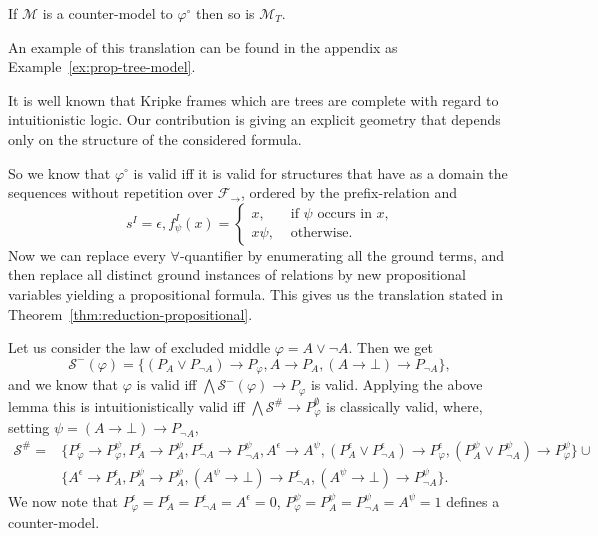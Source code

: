 \documentclass[runningheads]{llncs}
\begin{document}
\begin{corollary}\label{cor:prop-tree-model}
	If $\mathcal M$ is a counter-model to $\varphi^\circ$ then so is $\mathcal M_T$.
\end{corollary}

An example of this translation can be found in the appendix as Example~\ref{ex:prop-tree-model}.

\begin{remark}
	It is well known that Kripke frames which are trees are complete with regard to intuitionistic logic. Our contribution is giving an explicit geometry that depends only on the structure of the considered formula.
\end{remark}


So we know that $\varphi^\circ$ is valid iff it is valid for structures that have as a domain the sequences without repetition over $\mathcal F_\to$, ordered by the prefix-relation and $$s^I = \epsilon, f_\psi^I(x) = \begin{cases}
	x, &\text{ if $\psi$ occurs in $x$,}\\
	x\psi, &\text{ otherwise.}
\end{cases}$$
Now we can replace every $\forall$-quantifier by enumerating all the ground terms, and then replace all distinct ground instances of relations by new propositional variables yielding a propositional formula. This gives us the translation stated in Theorem~\ref{thm:reduction-propositional}.

\begin{example}
	Let us consider the law of excluded middle $\varphi = A\vee\neg A$. Then we get
	$$\mathcal S^-(\varphi) = \{(P_A\vee P_{\neg A})\to P_\varphi, A\to P_A, (A\to \bot)\to P_{\neg A}\},$$
	and we know that $\varphi$ is valid iff $\bigwedge \mathcal S^-(\varphi)\to P_\varphi$ is valid. Applying the above lemma this is intuitionistically valid iff $\bigwedge\mathcal S^\#\to P^\emptyset_\varphi$ is classically valid, where, setting $\psi = (A\to \bot)\to P_{\neg A}$,
	\begin{align*}
		\mathcal S^\# =&\{P_\varphi^\epsilon\to P_\varphi^{\psi}, P_A^\epsilon\to P_A^{\psi},P_{\neg A}^\epsilon\to P_{\neg A}^{\psi},A^\epsilon\to A^{\psi}, (P_A^\epsilon\vee P_{\neg A}^\epsilon)\to P_\varphi^\epsilon, (P_A^{\psi}\vee P_{\neg A}^{\psi})\to P_\varphi^{\psi}\}\cup\\ &\{A^\epsilon\to P_A^\epsilon, P_A^{\psi}\to P_A^{\psi}, (A^{\psi}\to \bot)\to P_{\neg A}^\epsilon, (A^{\psi}\to \bot)\to P_{\neg A}^{\psi}\}.
	\end{align*}
	We now note that $P_\varphi^\epsilon  = P_A^\epsilon = P_{\neg A}^\epsilon = A^\epsilon = 0$, $P_{\varphi}^{\psi} = P_A^{\psi} =  P_{\neg A}^{\psi} = A^{\psi} = 1$ defines a counter-model.
\end{example}	
\end{document}
